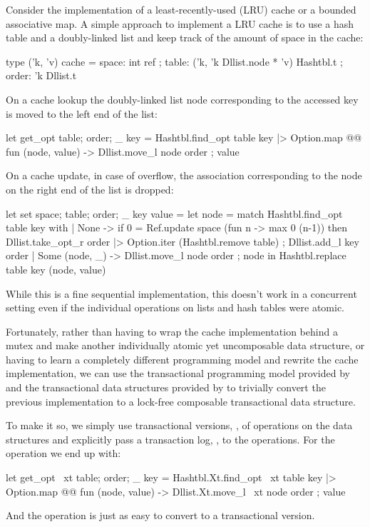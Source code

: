 Consider the implementation of a least-recently-used (LRU) cache or a bounded associative map.
A simple approach to implement a LRU cache is to use a hash table and a doubly-linked list and keep track of the amount of space in the cache:
\begin{ocamlcode}
type ('k, 'v) cache =
  { space: int ref
  ; table: ('k, 'k Dllist.node * 'v) Hashtbl.t
  ; order: 'k Dllist.t }
\end{ocamlcode}
On a cache lookup the doubly-linked list node corresponding to the accessed key is moved to the left end of the list:
\begin{ocamlcode}
let get_opt { table; order; _ } key =
  Hashtbl.find_opt table key
  |> Option.map @@ fun (node, value) ->
     Dllist.move_l node order ; value
\end{ocamlcode}
On a cache update, in case of overflow, the association corresponding to the node on the right end of the list is dropped:
\begin{ocamlcode}
let set { space; table; order; _ } key value =
  let node =
    match Hashtbl.find_opt table key with
    | None ->
        if 0 = Ref.update space (fun n -> max 0 (n-1)) then
          Dllist.take_opt_r order |> Option.iter (Hashtbl.remove table) ;
        Dllist.add_l key order
    | Some (node, _) ->
        Dllist.move_l node order ; node
  in
  Hashtbl.replace table key (node, value)
\end{ocamlcode}

While this is a fine sequential implementation, this doesn’t work in a concurrent setting even if the individual operations on lists and hash tables were atomic.

Fortunately, rather than having to wrap the cache implementation behind a mutex and make another individually atomic yet uncomposable data structure, or having to learn a completely different programming model and rewrite the cache implementation, we can use the transactional programming model provided by \Kcas and the transactional data structures provided by \KcasData to trivially convert the previous implementation to a lock-free composable transactional data structure.

To make it so, we simply use transactional versions, , of operations on the data structures and explicitly pass a transaction log, , to the operations.
For the  operation we end up with:
\begin{ocamlcode}
let get_opt ~xt { table; order; _ } key =
  Hashtbl.Xt.find_opt ~xt table key
  |> Option.map @@ fun (node, value) ->
     Dllist.Xt.move_l ~xt node order ; value
\end{ocamlcode}
And the  operation is just as easy to convert to a transactional version.

